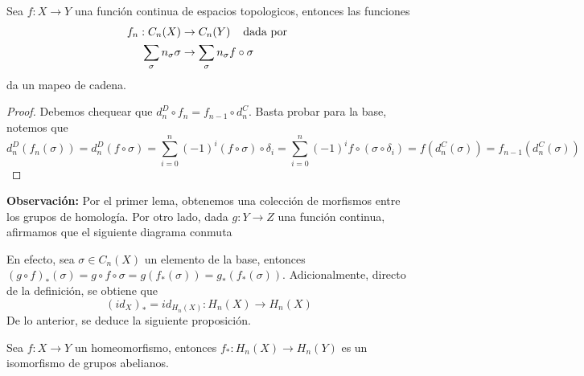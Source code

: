 \documentclass{article}
\begin{document}
\begin{prop}
    Sea $f:X\to Y$ una función continua de espacios topologicos, entonces las funciones
    \begin{align*}
        f_{n}:C_{n}(X) &\to C_{n}(Y)\hspace{4mm}\text{dada por } \\
        \sum_{\sigma}n_{\sigma}\sigma &\to \sum_{\sigma}n_{\sigma}f\circ\sigma
    \end{align*}
    da un mapeo de cadena.
\end{prop}
\begin{proof}
    Debemos chequear que $d_{n}^{D}\circ f_{n}=f_{n-1}\circ d_{n}^{C}$. Basta probar para la base,
    notemos que
    \begin{equation*}
        d_{n}^{D}(f_{n}(\sigma))=d_{n}^{D}(f\circ\sigma)
        =\sum_{i=0}^{n}(-1)^{i}(f\circ\sigma)\circ\delta_{i}
        =\sum_{i=0}^{n}(-1)^{i}f\circ(\sigma\circ\delta_{i})=f(d_{n}^{C}(\sigma))
        =f_{n-1}(d_{n}^{C}(\sigma))
    \end{equation*}
\end{proof}

\noindent\textbf{Observación:} Por el primer lema, obtenemos una colección de morfismos entre los 
grupos de homología. Por otro lado, dada $g:Y\to Z$ una función continua, afirmamos que el 
siguiente diagrama conmuta

\vspace{2mm}
\centerline{
}
\vspace{2mm}

\noindent En efecto, sea $\sigma\in C_{n}(X)$ un elemento de la base, entonces 
$(g\circ f)_{*}(\sigma)=g\circ f\circ\sigma=g(f_{*}(\sigma))=g_{*}(f_{*}(\sigma))$. Adicionalmente,
directo de la definición, se obtiene que
\begin{equation*}
    (id_{X})_{*}=id_{H_{n}(X)}:H_{n}(X)\to H_{n}(X)
\end{equation*}
De lo anterior, se deduce la siguiente proposición.

\vspace{2mm}
\begin{prop}
    Sea $f:X\to Y$ un homeomorfismo, entonces $f_{*}:H_{n}(X)\to H_{n}(Y)$ es un isomorfismo de 
    grupos abelianos.
\end{prop}
\end{document}
